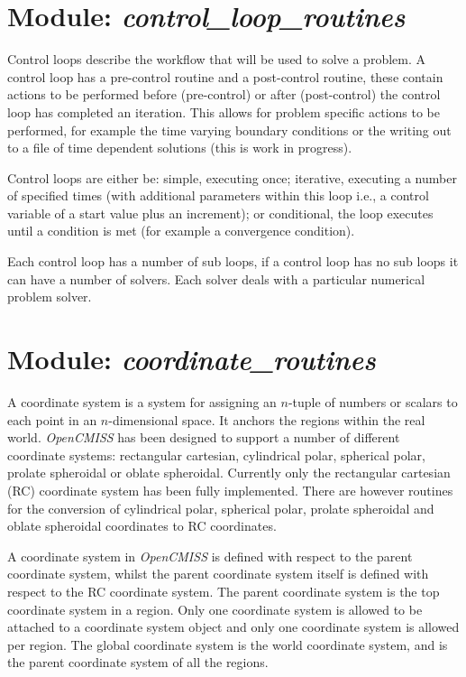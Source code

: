 \section{Module: \emph{control\_loop\_routines}}
\label{sec:controllooproutines}

Control loops describe the workflow that will be used to solve a problem.
A control loop has a pre-control routine and a post-control routine, these 
contain actions to be performed before (pre-control) or after (post-control) 
the control loop has completed an iteration. This allows for problem specific 
actions to be performed, for example the time varying boundary conditions or 
the writing out to a file of time dependent solutions (this is work in
progress).

Control loops are either be: simple, executing once; iterative, executing a
number of specified times (with additional parameters within this loop i.e., 
a control variable of a start value plus an increment); or conditional, the 
loop executes until a condition is met (for example a convergence condition).

Each control loop has a number of sub loops, if a control loop has no sub loops 
it can have a number of solvers. Each solver deals with a particular numerical 
problem solver.


\section{Module: \emph{coordinate\_routines}}
\label{sec:coordinateroutines}

A coordinate system is a system for assigning an $n$-tuple of numbers or scalars 
to each point in an $n$-dimensional space. It anchors the regions within the real
world. \emph{OpenCMISS} has been designed to support a number of different coordinate 
systems: rectangular cartesian, cylindrical polar, spherical polar, prolate 
spheroidal or oblate spheroidal. Currently only the rectangular cartesian (RC) 
coordinate system has been fully implemented. There are however routines for 
the conversion of cylindrical polar, spherical polar, prolate spheroidal and 
oblate spheroidal coordinates to RC coordinates.

A coordinate system in \emph{OpenCMISS} is defined with respect to the parent 
coordinate system, whilst the parent coordinate system itself is defined with 
respect to the RC coordinate system. The parent coordinate system is the top 
coordinate system in a region. Only one coordinate system is allowed to be 
attached to a coordinate system object and only one coordinate system is 
allowed per region. The global coordinate system is the world coordinate 
system, and is the parent coordinate system of all the regions. 


